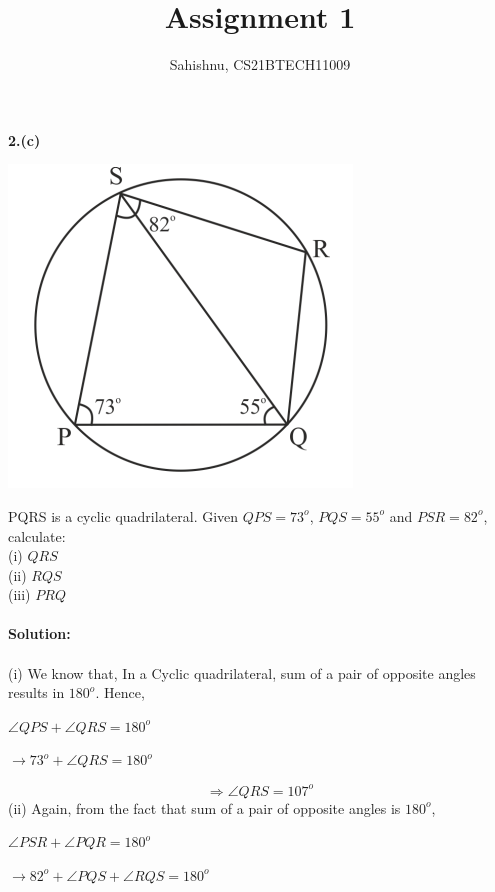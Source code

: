 \documentclass[8pt, twocolumn]{article}
\title{Assignment 1}
\author{Sahishnu, CS21BTECH11009}
\date{}
\begin{document}
\maketitle
\textbf {2.(c)}\\
\begin{center}
\includegraphics[scale=0.5]{figs/fig1.png}
\end{center}
PQRS is a cyclic quadrilateral. Given \angle $QPS=73^o$, \angle $PQS=55^o$ and \angle $PSR=82^o$, calculate:\\
(i) \angle $QRS$\\
(ii) \angle $RQS$\\
(iii) \angle $PRQ$\\\\
\textbf {Solution: }\\\\
(i) We know that, In a Cyclic quadrilateral, sum of a pair of opposite angles results in $180^o$.
Hence,
\begin{center}
   $\angle QPS + \angle QRS = 180^o$
\end{center}
\begin{center}
$\rightarrow 73^o + \angle QRS = 180^o$
\end{center}
\begin{equation}
    \Rightarrow \angle QRS = 107^o
\end{equation}
(ii) Again, from the fact that sum of a pair of opposite angles is $180^o$,
\begin{center}
    $\angle PSR + \angle PQR = 180^o$
\end{center}
\begin{center}
    $\rightarrow 82^o + \angle PQS + \angle RQS = 180^o $
\end{center}
\end{document}
